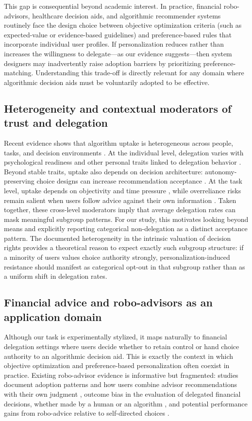 \documentclass[a4paper, 12pt, fleqn]{article}
\theoremstyle{definition}
\newcommand{\inew}[1]{{\color{blue} #1\color{black}}}
\begin{document}
This gap is consequential beyond academic interest. In practice, financial robo-advisors, healthcare decision aids, and algorithmic recommender systems routinely face the design choice between objective optimization criteria (such as expected-value or evidence-based guidelines) and preference-based rules that incorporate individual user profiles. If personalization reduces rather than increases the willingness to delegate---as our evidence suggests---then system designers may inadvertently raise adoption barriers by prioritizing preference-matching. Understanding this trade-off is directly relevant for any domain where algorithmic decision aids must be voluntarily adopted to be effective.

\subsection{Heterogeneity and contextual moderators of trust and delegation}
Recent evidence shows that algorithm uptake is heterogeneous across people, tasks, and decision environments \citep{Ferraz2025,Yang2025}. At the individual level, delegation varies with psychological readiness and other personal traits linked to delegation behavior \citep{Kim2026,Ferraz2025}. Beyond stable traits, uptake also depends on decision architecture: autonomy-preserving choice designs can increase recommendation acceptance \citep{Fink2024}. At the task level, uptake depends on objectivity and time pressure \citep{Yang2025}, while overreliance risks remain salient when users follow advice against their own information \citep{Klingbeil2024}. Taken together, these cross-level moderators imply that average delegation rates can mask meaningful subgroup patterns. For our study, this motivates looking beyond means and explicitly reporting categorical non-delegation as a distinct acceptance pattern. \inew{The documented heterogeneity in the intrinsic valuation of decision rights \citep{Bartling2014,Owens2014} provides a theoretical reason to expect exactly such subgroup structure: if a minority of users values choice authority strongly, personalization-induced resistance should manifest as categorical opt-out in that subgroup rather than as a uniform shift in delegation rates.}

\subsection{Financial advice and robo-advisors as an application domain}
Although our task is experimentally stylized, it maps naturally to financial delegation settings where users decide whether to retain control or hand choice authority to an algorithmic decision aid. This is exactly the context in which objective optimization and preference-based personalization often coexist in practice. Existing robo-advisor evidence is informative but fragmented: studies document adoption patterns and how users combine advisor recommendations with their own judgment \citep{Figa-Talamanca2022,Mahmud2025}, outcome bias in the evaluation of delegated financial decisions, whether made by a human or an algorithm \citep{Ismagilova2025}, and potential performance gains from robo-advice relative to self-directed choices \citep{Lambrecht2023}. 
\end{document}
